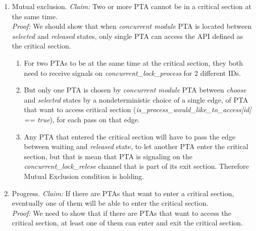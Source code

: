 \begin{enumerate} 
\item Mutual exclusion. \newline
\textit{Claim:} Two or more PTA cannot be in a critical section at the same time.\\
\textit{Proof:} We should show that when \textit{concurrent module} PTA is located between \textcolor{ColorUppaalState}{\textit{selected}} and \textcolor{ColorUppaalState}{\textit{released}} states, only single PTA can access the API defined as the critical section.
\begin{enumerate} 
\item For two PTAs to be at the same time at the critical section, they both need to receive signals on \textcolor{ColorUppaalChannel}{\textit{concurrent_lock_process}} for 2 different IDs.  
\item But only one PTA is chosen by \textit{concurrent module} PTA between \textcolor{ColorUppaalState}{\textit{choose}} and \textcolor{ColorUppaalState}{\textit{selected}} states by a nondeterministic choice of a single edge, of PTA that want to access critical section (\textcolor{ColorEdgeGuard}{\textit{is_process_would_like_to_access[id] == true}}), for each pass on that edge. 
\item Any PTA that entered the critical section will have to pass the edge between waiting and \textcolor{ColorUppaalState}{\textit{released}} state, to let another PTA enter the critical section, but that is mean that PTA is signaling on the \textcolor{ColorUppaalChannel}{\textit{concurrent_lock_relese}} channel that is part of its exit section. Therefore Mutual Exclusion condition is holding.
\end{enumerate} 
\item Progress. \newline
\textit{Claim:} If there are PTAs that want to enter a critical section, eventually one of them will be able to enter the critical section. \\
\textit{Proof:} We need to show that if there are PTAs that want to access the critical section, at least one of them can enter and exit the critical section.
\begin{enumerate} 

\end{enumerate}
\end{enumerate}
